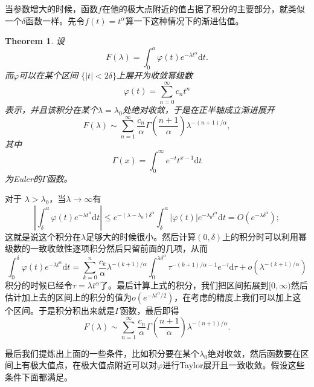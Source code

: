 \documentclass[10pt]{book}
\theoremstyle{plain}%
\newtheorem{theo}{Theorem}[chapter]%
\begin{document}
当参数增大的时候，函数$f$在他的极大点附近的值占据了积分的主要部分，就类似一个$\delta$函数一样。先令$f(t)=t^\alpha$算一下这种情况下的渐进估值。

\begin{theo}
设\[
F(\lambda)=\int_0^a \varphi(t) e^{-\lambda t^\alpha} \mathrm{d}t.
\]
而$\varphi$可以在某个区间 $\{|t|<2\delta\}$上展开为收敛幂级数
\[
\varphi(t)=\sum_{n=0}^\infty c_nt^n
\]
表示，并且该积分在某个$\lambda=\lambda_0$处绝对收敛，于是在正半轴成立渐进展开
\[
F(\lambda) \sim \sum_{n=1}^\infty \frac{c_n}{\alpha}\Gamma\left(\frac{n+1}{\alpha}\right)\lambda^{-(n+1)/\alpha } ,
\]
其中\[\Gamma(x)=\int_{0}^\infty e^{-t}t^{x-1}\mathrm{d}t\]为Euler的$\Gamma$函数。
\end{theo}
对于 $\lambda >\lambda_ 0$，当$\lambda \to \infty$有
\[
\left|\int_\delta^a \varphi(t) e^{-\lambda t^\alpha} \mathrm{d}t\right|\leq e^{- (\lambda-\lambda_0)\delta^\alpha}\int_\delta^a|\varphi(t)|e^{-\lambda_0t^\alpha}\mathrm{d}t=O(e^{- \lambda\delta^\alpha});
\]
这就是说这个积分在$\lambda$足够大的时候很小。然后计算$(0,\delta)$上的积分时可以利用幂级数的一致收敛性逐项积分然后只留前面的几项，从而
\[
\int^\delta_0 \varphi(t) e^{-\lambda t^\alpha} \mathrm{d}t=\sum_{k=0}^n\frac{c_k}{\alpha}\lambda^{-(k+1)/\alpha}\int_0^{\lambda\delta^\alpha}\tau^{-(k+1)/\alpha-1}
e^{-\tau}\mathrm{d}\tau+o(\lambda^{-(k+1)/\alpha})
\]
积分的时候已经令$\tau=\lambda t^\alpha$了。最后计算上式的积分，我们把区间拓展到$[0,\infty)$然后估计加上去的区间上的积分的值为$o(e^{-\lambda t^\alpha/2})$，在考虑的精度上我们可以加上这个区间。于是积分积出来就是$\Gamma$函数，最后即得
\[
F(\lambda) \sim \sum_{n=1}^\infty \frac{c_n}{\alpha}\Gamma\left(\frac{n+1}{\alpha}\right)\lambda^{-(n+1)/\alpha } .
\]

最后我们提炼出上面的一些条件，比如积分要在某个$\lambda_0$绝对收敛，然后函数要在区间上有极大值点，在极大值点附近可以对$\varphi$进行Taylor展开且一致收敛。假设这些条件下面都满足。
\end{document}
